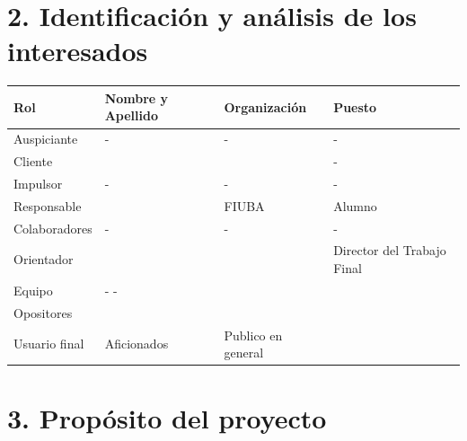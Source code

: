 \documentclass[
11pt, %
]{charter}
\begin{document}
	\vspace{25px}



\section{2. Identificación y análisis de los interesados}
\label{sec:interesados}



	\begin{table}[ht]
		\begin{tabularx}{\linewidth}{@{}|l|X|X|l|@{}}
			\hline
			\rowcolor[HTML]{C0C0C0}
			Rol           & Nombre y Apellido & Organización       & Puesto                     \\ \hline
			Auspiciante   & -                 & -                  & -                          \\ \hline
			Cliente       & \clientename      & \empclientename    & -                           \\ \hline
			Impulsor      & -                 & -                  & -                          \\ \hline
			Responsable   & \authorname       & FIUBA              & Alumno                     \\ \hline
			Colaboradores & -                 & -                  & -                           \\ \hline
			Orientador    & \supname          & \pertesupname      & Director del Trabajo Final \\ \hline
			Equipo        & - \newline
			-      		  &                   &                                              \\ \hline
			Opositores    &                   &                    &                            \\ \hline
			Usuario final & Aficionados       & Publico en general &                            \\ \hline
		\end{tabularx}
	\end{table}




\section{3. Propósito del proyecto}
\label{sec:proposito}
\end{document}

